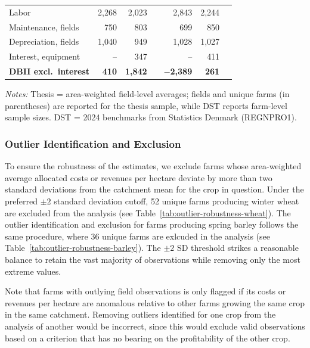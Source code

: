 \documentclass[12pt]{article}
\begin{document}
\begin{table}[H]
\begin{threeparttable}
\begin{tabular}{lrrrrrr}
\quad Labor                       &       2,268 &  2,023 & &       2,843 &  2,244 \\
\quad Maintenance, fields         &         750 &    803 & &         699 &    850 \\
\quad Depreciation, fields        &       1,040 &    949 & &       1,028 &  1,027 \\
\quad Interest, equipment         &          -- &    347 & &          -- &    411 \\
\addlinespace
\midrule
\textbf{DBII excl.\ interest}     
& \textbf{410} & \textbf{1,842} & &
  \textbf{$-$2,389} & \textbf{261} \\
\bottomrule
\end{tabular}
\begin{tablenotes}
\footnotesize
\item \textit{Notes:} Thesis = area-weighted field-level averages; fields and unique farms
(in parentheses) are reported for the thesis sample, while DST reports farm-level sample
sizes. DST = 2024 benchmarks from Statistics Denmark (REGNPRO1).
\end{tablenotes}
\end{threeparttable}
\end{table}



\subsubsection{Outlier Identification and Exclusion}
To ensure the robustness of the estimates, we exclude farms whose area-weighted average allocated costs or revenues per hectare deviate by more than two standard deviations from the catchment mean for the crop in question.
Under the preferred $\pm 2$ standard deviation cutoff, 52 unique farms producing winter wheat are excluded from the analysis (see Table~\ref{tab:outlier-robustness-wheat}).
The outlier identification and exclusion for farms producing spring barley follows the same procedure, where 36 unique farms are exlcuded in the analysis (see Table~\ref{tab:outlier-robustness-barley}).
The $\pm 2$ SD threshold strikes a reasonable balance to retain the vast majority of observations while removing only the most extreme values. %

Note that farms with outlying field observations is only flagged if its costs or revenues per hectare are anomalous relative to other farms growing the same crop in the same catchment.
Removing outliers identified for one crop from the analysis of another would be incorrect, since this would exclude valid observations based on a criterion that has no bearing on the profitability of the other crop.
\end{document}
